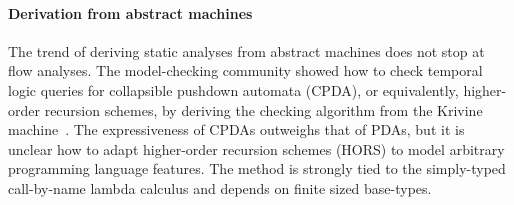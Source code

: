 \paragraph{Derivation from abstract machines}
The trend of deriving static analyses from abstract machines does not stop at flow analyses.
%
The model-checking community showed how to check temporal logic queries for collapsible pushdown automata (CPDA), or equivalently, higher-order recursion schemes, by deriving the checking algorithm from the Krivine machine~\citep{ianjohnson:Salvati:2011:KMH:2027223.2027239}.
%
The expressiveness of CPDAs outweighs that of PDAs, but it is unclear how to adapt higher-order recursion schemes (HORS) to model arbitrary programming language features.
%
The method is strongly tied to the simply-typed call-by-name lambda calculus and depends on finite sized base-types.
%
